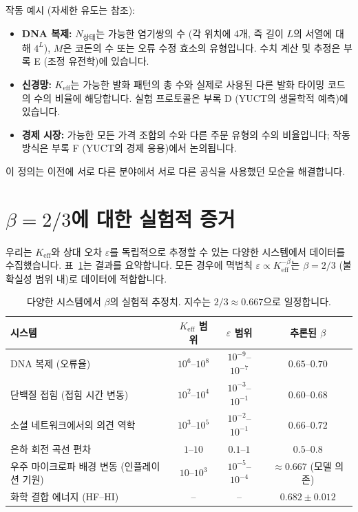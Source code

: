 \documentclass[11pt,a4paper]{article}
\newcommand{\Keff}{K_{\mathrm{eff}}}
\newcommand{\eps}{\varepsilon}
\begin{document}
	작동 예시 (자세한 유도는 참조):
	\begin{itemize}
		\item \textbf{DNA 복제:} \(N_{\text{상태}}\)는 가능한 염기쌍의 수 (각 위치에 4개, 즉 길이 \(L\)의 서열에 대해 \(4^L\)), \(M\)은 코돈의 수 또는 오류 수정 효소의 유형입니다. 수치 계산 및 추정은 부록 E (조정 유전학)에 있습니다.
		\item \textbf{신경망:} \(\Keff\)는 가능한 발화 패턴의 총 수와 실제로 사용된 다른 발화 타이밍 코드의 수의 비율에 해당합니다. 실험 프로토콜은 부록 D (YUCT의 생물학적 예측)에 있습니다.
		\item \textbf{경제 시장:} 가능한 모든 가격 조합의 수와 다른 주문 유형의 수의 비율입니다; 작동 방식은 부록 F (YUCT의 경제 응용)에서 논의됩니다.
	\end{itemize}
	이 정의는 이전에 서로 다른 분야에서 서로 다른 공식을 사용했던 모순을 해결합니다.
	
	\section{\(\beta = 2/3\)에 대한 실험적 증거}
	\label{sec:evidence}
	
	우리는 \(\Keff\)와 상대 오차 \(\eps\)를 독립적으로 추정할 수 있는 다양한 시스템에서 데이터를 수집했습니다. 표~\ref{tab:data}는 결과를 요약합니다. 모든 경우에 멱법칙 \(\eps \propto \Keff^{-\beta}\)는 \(\beta = 2/3\) (불확실성 범위 내)로 데이터에 적합합니다.
	
	\begin{table}[htbp]
		\centering
		\caption{다양한 시스템에서 \(\beta\)의 실험적 추정치. 지수는 \(2/3 \approx 0.667\)으로 일정합니다.}
		\label{tab:data}
		\begin{tabular}{lccc}
			\toprule
			시스템 & \(\Keff\) 범위 & \(\eps\) 범위 & 추론된 \(\beta\) \\
			\midrule
			DNA 복제 (오류율) & \(10^6\)–\(10^8\) & \(10^{-9}\)–\(10^{-7}\) & \(0.65\)–\(0.70\) \\
			단백질 접힘 (접힘 시간 변동) & \(10^2\)–\(10^4\) & \(10^{-3}\)–\(10^{-1}\) & \(0.60\)–\(0.68\) \\
			소셜 네트워크에서의 의견 역학 & \(10^3\)–\(10^5\) & \(10^{-2}\)–\(10^{-1}\) & \(0.66\)–\(0.72\) \\
			은하 회전 곡선 편차 & \(1\)–\(10\) & \(0.1\)–\(1\) & \(0.5\)–\(0.8\) \\
			우주 마이크로파 배경 변동 (인플레이션 기원) & \(10\)–\(10^3\) & \(10^{-5}\)–\(10^{-4}\) & \(\approx 0.667\) (모델 의존) \\
			화학 결합 에너지 (HF–HI) & – & – & \(0.682 \pm 0.012\) \\
			\bottomrule
		\end{tabular}
	\end{table}
	
\end{document}
